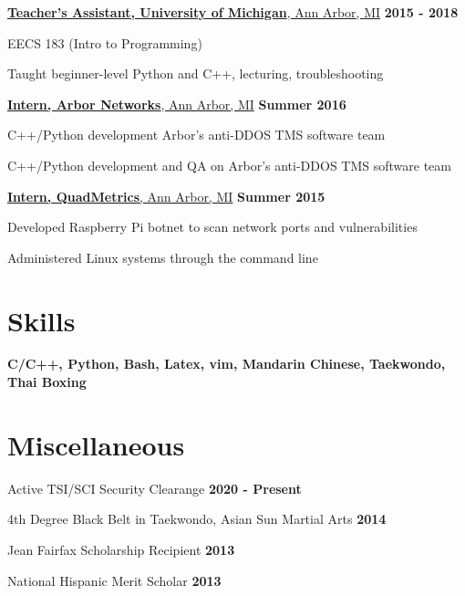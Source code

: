 \documentclass[margin,line]{resume}
\begin{document}
\begin{resume}
    \underline{\textbf{Teacher's Assistant, University of Michigan}, Ann Arbor, MI}
    \hfill \textbf{2015 - 2018} \\

    \begin{list2}
    \item EECS 183 (Intro to Programming)
    \item Taught beginner-level Python and C++, lecturing, troubleshooting
    \end{list2}

    \underline{\textbf{Intern, Arbor Networks}, Ann Arbor, MI}
    \hfill \textbf{Summer 2016} \\

    \begin{list2}
    \item C++/Python development Arbor's anti-DDOS TMS software team
    \item C++/Python development and QA on Arbor's anti-DDOS TMS software team
    \end{list2}

    \underline{\textbf{Intern, QuadMetrics}, Ann Arbor, MI}
    \hfill \textbf{\hfill Summer 2015} \\

    \begin{list2}
    \item Developed Raspberry Pi botnet to scan network ports and vulnerabilities
    \item Administered Linux systems through the command line
    \end{list2}

    \section{\mysidestyle Skills}
    \hfill

    \textbf{C/C++, Python, Bash, Latex, vim, Mandarin Chinese, Taekwondo, Thai Boxing}

    \section{\mysidestyle Miscellaneous}
    \hfill

    \begin{list2}
    \item Active TSI/SCI Security Clearange \hfill \textbf{2020 - Present}
    \item 4th Degree Black Belt in Taekwondo, Asian Sun Martial Arts \hfill \textbf{2014}
    \item Jean Fairfax Scholarship Recipient \hfill \textbf{2013}
    \item National Hispanic Merit Scholar \hfill \textbf{2013}
    \end{list2}


\end{resume}
\end{document}
